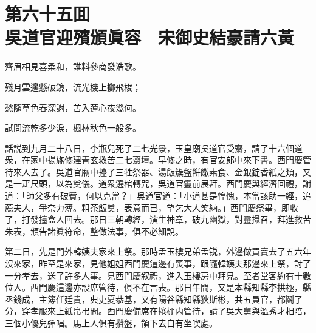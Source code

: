 
\chapter*{第六十五囬　\\吳道官迎殯頒眞容　宋御史結豪請六黃}


\begin{myquote}
齊眉相見喜柔和，誰料參商發浩歌。

殘月雲邊懸破鏡，流光機上擲飛梭；

愁隨草色春深謝，苦入蓮心夜幾何。

試問流乾多少淚，楓林秋色一般多。
\end{myquote}

話説到九月二十八日，李瓶兒死了二七光景，玉皇廟吳道官受齋，請了十六個道衆，在家中揚旛修建青玄救苦二七齋壇。早修之時，有官安郎中來下書。西門慶管待來人去了。吳道官廟中擡了三牲祭器、湯飯簇盤餅饊素食、金銀錠香紙之類，又是一疋尺頭，以為奠儀。道衆遶棺轉咒，吳道官靈前展拜。西門慶與經濟回禮，謝道：「師父多有破費，何以克當？」吳道官道：「小道甚是惶愧，本當該助一經，追薦夫人，爭奈力薄。粗茶飯奠，表意而已，望乞大人笑納。」西門慶祭畢，即收了，打發擡盒人回去。那日三朝轉經，演生神章，破九幽獄，對靈攝召，拜進救苦朱表，頒告諸眞符命，整做法事，俱不必細說。

第二日，先是門外韓姨夫家來上祭。那時孟玉樓兄弟孟锐，外邊做買賣去了五六年沒來家，昨至是來家，見他姐姐西門慶這邊有喪事，跟隨韓姨夫那邊來上祭，討了一分孝去，送了許多人事。見西門慶叙禮，進入玉樓房中拜見。至者堂客約有十數位人。西門慶這邊亦設席管待，俱不在言表。那日午間，又是本縣知縣李拱極，縣丞錢成，主簿任廷貴，典吏夏恭基，又有陽谷縣知縣狄斯彬，共五員官，都鬬了分，穿孝服來上紙帛弔問。西門慶備席在捲棚内管待，請了吳大舅與溫秀才相陪，三個小優兒彈唱。馬上人俱有攢盤，領下去自有坐喫處。

